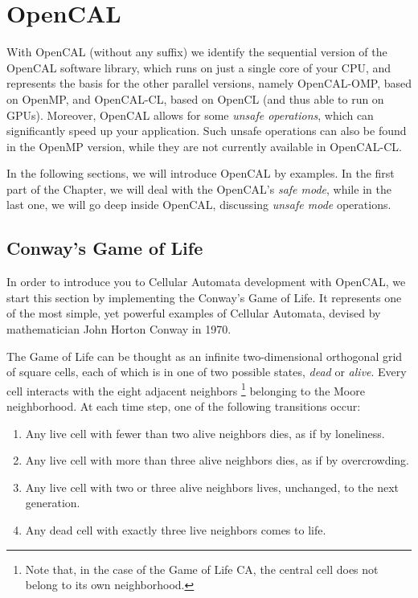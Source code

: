 \chapter{OpenCAL}\label{ch:opencal}

With OpenCAL (without any suffix) we identify the sequential version
of the OpenCAL software library, which runs on just a single core of
your CPU, and represents the basis for the other parallel versions,
namely OpenCAL-OMP, based on OpenMP, and OpenCAL-CL, based on OpenCL
(and thus able to run on GPUs). Moreover, OpenCAL allows for some
\emph{unsafe operations}, which can significantly speed up your
application. Such unsafe operations can also be found in the OpenMP
version, while they are not currently available in OpenCAL-CL.

In the following sections, we will introduce OpenCAL by examples. In
the first part of the Chapter, we will deal with the OpenCAL's
\emph{safe mode}, while in the last one, we will go deep inside
OpenCAL, discussing \emph{unsafe mode} operations.

\section{Conway's Game of Life}\label{sec:cal_life}

In order to introduce you to Cellular Automata development with
OpenCAL, we start this section by implementing the Conway's Game of
Life. It represents one of the most simple, yet powerful examples of
Cellular Automata, devised by mathematician John Horton Conway in
1970.

The Game of Life can be thought as an infinite two-dimensional
orthogonal grid of square cells, each of which is in one of two
possible states, \emph{dead} or \emph{alive}. Every cell interacts
with the eight adjacent neighbors \footnote{Note that, in the case of
  the Game of Life CA, the central cell does not belong to its own
  neighborhood.} belonging to the Moore neighborhood. At each time
step, one of the following transitions occur:

\begin{enumerate}
    \item Any live cell with fewer than two alive neighbors dies, as
      if by loneliness.
    \item Any live cell with more than three alive neighbors dies, as
      if by overcrowding.
    \item Any live cell with two or three alive neighbors lives,
      unchanged, to the next generation.
    \item Any dead cell with exactly three live neighbors comes to
      life.
\end{enumerate}

